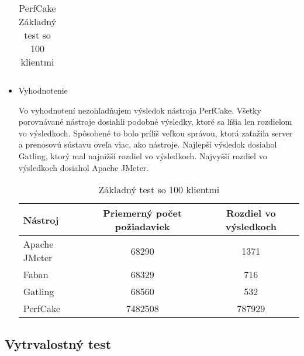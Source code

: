 \documentclass[12pt,oneside,final]{fithesis-utf8}
\begin{document}
\begin{itemize}
\begin{table}[H]
\begin{center}
\begin{tabular}{ | l | c | c | c | c |}
\end{tabular}
\end{center}
\caption{PerfCake Základný test so 100 klientmi}
\end{table}

\item Vyhodnotenie

Vo vyhodnotení nezohľadňujem výsledok nástroja PerfCake. Všetky porovnávané nástroje dosiahli podobné výsledky, ktoré sa líšia len rozdielom vo výsledkoch. Spôsobené to bolo príliš veľkou správou, ktorá zaťažila server a prenosovú sústavu oveľa viac, ako nástroje. Najlepší výsledok dosiahol Gatling, ktorý mal najnižší rozdiel vo výsledkoch. Najvyšší rozdiel vo výsledkoch dosiahol Apache JMeter.

\begin{table}[H]
\begin{center}
\begin{tabular}{ | l | c | c |}
		\hline
		 \textbf{Nástroj} & \textbf{Priemerný počet požiadaviek} & \textbf{Rozdiel vo výsledkoch} \\ \hline
		 Apache JMeter & 68290 & 1371 \\ \hline
		 Faban & 68329 & 716 \\ \hline
		 Gatling & 68560 & 532 \\ \hline
		 PerfCake & 7482508 & 787929 \\ \hline
\end{tabular}
\end{center}
\caption{Základný test so 100 klientmi}
\end{table}

\end{itemize}

\subsection{Vytrvalostný test}
\end{document}
